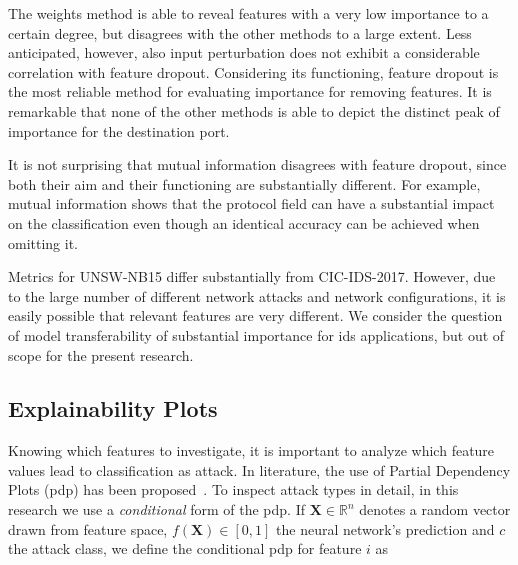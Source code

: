 \documentclass[conference]{IEEEtran}
\begin{document}
The weights method is able to reveal features with a very low importance to a certain degree, but disagrees with the other methods to a large extent. Less anticipated, however, also input perturbation does not exhibit a considerable correlation with feature dropout. Considering its functioning, feature dropout is the most reliable method for evaluating importance for removing features. It is remarkable that none of the other methods is able to depict the distinct peak of importance for the destination port.

It is not surprising that mutual information disagrees with feature dropout, since both their aim and their functioning are substantially different. For example, mutual information shows that the protocol field can have a substantial impact on the classification even though an identical accuracy can be achieved when omitting it.


Metrics for UNSW-NB15 differ substantially from CIC-IDS-2017. However, due to the large number of different network attacks and network configurations, it is easily possible that relevant features are very different. We consider the question of model transferability of substantial importance for \gls{ids} applications, but out of scope for the present research.

\subsection{Explainability Plots}
Knowing which features to investigate, it is important to analyze which feature values lead to classification as attack.
In literature, the use of Partial Dependency Plots (\gls{pdp}) has been proposed~\cite{friedman_greedy_2001}. To inspect attack types in detail, in this research we use a \textit{conditional} form of the \gls{pdp}. If $\boldsymbol X \in \mathbb R ^n$ denotes a random vector drawn from feature space, $f(\boldsymbol X) \in [0,1]$ the neural network's prediction and $c$ the attack class, we define the conditional \gls{pdp} for feature $i$  as
\end{document}
